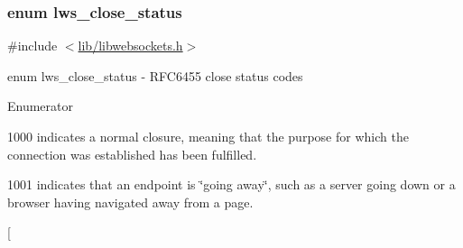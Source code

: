 \subsubsection[{\texorpdfstring{lws\+\_\+close\+\_\+status}{lws\_close\_status}}]{\setlength{\rightskip}{0pt plus 5cm}enum {\bf lws\+\_\+close\+\_\+status}}\hypertarget{group__wsclose_gae399c571df32ba532c0ca67da9284985}{}\label{group__wsclose_gae399c571df32ba532c0ca67da9284985}


{\ttfamily \#include $<$\hyperlink{libwebsockets_8h}{lib/libwebsockets.\+h}$>$}

enum lws\+\_\+close\+\_\+status -\/ R\+F\+C6455 close status codes \begin{Desc}
\item[Enumerator]\par
\begin{description}
\item[{\em 
L\+W\+S\+\_\+\+C\+L\+O\+S\+E\+\_\+\+S\+T\+A\+T\+U\+S\+\_\+\+N\+O\+R\+M\+AL\hypertarget{group__wsclose_ggae399c571df32ba532c0ca67da9284985a3ffa38d5081b85fb739e02a747ccf2c4}{}\label{group__wsclose_ggae399c571df32ba532c0ca67da9284985a3ffa38d5081b85fb739e02a747ccf2c4}
}]1000 indicates a normal closure, meaning that the purpose for which the connection was established has been fulfilled. \item[{\em 
L\+W\+S\+\_\+\+C\+L\+O\+S\+E\+\_\+\+S\+T\+A\+T\+U\+S\+\_\+\+G\+O\+I\+N\+G\+A\+W\+AY\hypertarget{group__wsclose_ggae399c571df32ba532c0ca67da9284985a9737a68759e739856b150ff9dfa30218}{}\label{group__wsclose_ggae399c571df32ba532c0ca67da9284985a9737a68759e739856b150ff9dfa30218}
}]1001 indicates that an endpoint is \char`\"{}going away\char`\"{}, such as a server going down or a browser having navigated away from a page. \item[{\em 
}
\end{description}
\end{Desc}
